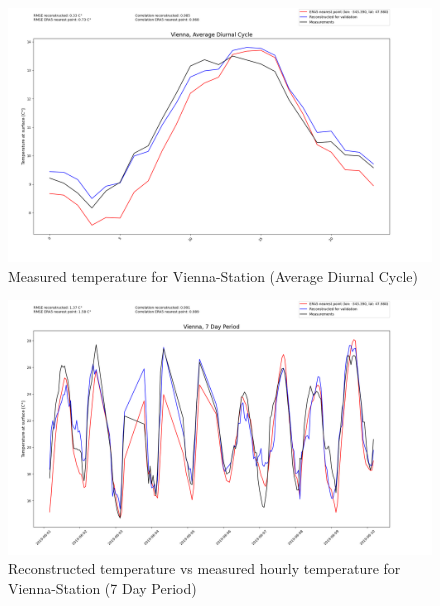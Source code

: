 \begin{figure}
    \centering
    \includegraphics[width=1.02\textwidth]{resources/images/charts/vienna_eval_grib_final/Vienna, Average Diurnal Cycle.png}
    \caption{Measured temperature for Vienna-Station (Average Diurnal Cycle)}
\end{figure}

\begin{figure}
    \centering
    \includegraphics[width=1.02\textwidth]{resources/images/charts/vienna_eval_grib_final/Vienna, 7 Day Period_1_2_3.png}
    \caption{Reconstructed temperature vs measured hourly temperature for Vienna-Station (7 Day Period)}
\end{figure}

